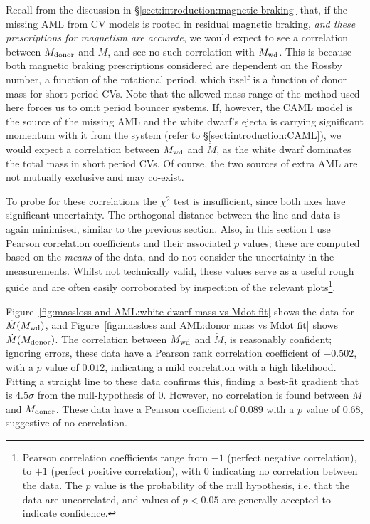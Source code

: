 Recall from the discussion in \S\ref{sect:introduction:magnetic braking} that, if the missing AML from CV models is rooted in residual magnetic braking, \textit{and these prescriptions for magnetism are accurate}, we would expect to see a correlation between $M_{\rm donor}$ and $\dot M$, and see no such correlation with $M_{\rm wd}$.
This is because both magnetic braking prescriptions considered are dependent on the Rossby number, a function of the rotational period, which itself is a function of donor mass for short period CVs. Note that the allowed mass range of the method used here forces us to omit period bouncer systems.
If, however, the CAML model is the source of the missing AML and the white dwarf's ejecta is carrying significant momentum with it from the system (refer to \S\ref{sect:introduction:CAML}), we would expect a correlation between $M_{\rm wd}$ and $\dot M$, as the white dwarf dominates the total mass in short period CVs.
Of course, the two sources of extra AML are not mutually exclusive and may co-exist.

To probe for these correlations the $\chi^2$ test is insufficient, since both axes have significant uncertainty. The orthogonal distance between the line and data is again minimised, similar to the previous section.
Also, in this section I use Pearson correlation coefficients and their associated $p$ values; these are computed based on the \textit{means} of the data, and do not consider the uncertainty in the measurements.
Whilst not technically valid, these values serve as a useful rough guide and are often easily corroborated by inspection of the relevant plots\footnote{Pearson correlation coefficients range from $-1$ (perfect negative correlation), to $+1$ (perfect positive correlation), with 0 indicating no correlation between the data. The $p$ value is the probability of the null hypothesis, i.e. that the data are uncorrelated, and values of $p < 0.05$ are generally accepted to indicate confidence.}.

Figure~\ref{fig:massloss and AML:white dwarf mass vs Mdot fit} shows the data for $\dot M(M_{\rm wd})$, and Figure~\ref{fig:massloss and AML:donor mass vs Mdot fit} shows $\dot M(M_{\rm donor})$.
The correlation between $M_{\rm wd}$ and $\dot M$, is reasonably confident; ignoring errors, these data have a Pearson rank correlation coefficient of $-0.502$, with a $p$ value of $0.012$, indicating a mild correlation with a high likelihood. Fitting a straight line to these data confirms this, finding a best-fit gradient that is $4.5\sigma$ from the null-hypothesis of 0.
However, no correlation is found between $\dot M$ and $M_{\rm donor}$. These data have a Pearson coefficient of $0.089$ with a $p$ value of $0.68$, suggestive of no correlation.

